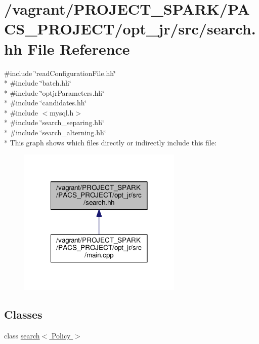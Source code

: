 \hypertarget{search_8hh}{\section{/vagrant/\-P\-R\-O\-J\-E\-C\-T\-\_\-\-S\-P\-A\-R\-K/\-P\-A\-C\-S\-\_\-\-P\-R\-O\-J\-E\-C\-T/opt\-\_\-jr/src/search.hh File Reference}
\label{search_8hh}
}
{\ttfamily \#include \char`\"{}read\-Configuration\-File.\-hh\char`\"{}}\\*
{\ttfamily \#include \char`\"{}batch.\-hh\char`\"{}}\\*
{\ttfamily \#include \char`\"{}optjr\-Parameters.\-hh\char`\"{}}\\*
{\ttfamily \#include \char`\"{}candidates.\-hh\char`\"{}}\\*
{\ttfamily \#include $<$mysql.\-h$>$}\\*
{\ttfamily \#include \char`\"{}search\-\_\-separing.\-hh\char`\"{}}\\*
{\ttfamily \#include \char`\"{}search\-\_\-alterning.\-hh\char`\"{}}\\*
This graph shows which files directly or indirectly include this file\-:
\nopagebreak
\begin{figure}[H]
\begin{center}
\leavevmode
\includegraphics[width=222pt]{search_8hh__dep__incl}
\end{center}
\end{figure}
\subsection*{Classes}
\begin{DoxyCompactItemize}
\item 
class \hyperlink{classsearch}{search$<$ Policy $>$}
\end{DoxyCompactItemize}
